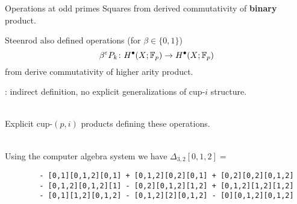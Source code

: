 
%
%
%

\begin{frame}[fragile]{Operations at odd primes}
	\pause
	Squares from derived commutativity of \textbf{binary} product.

	\medskip\pause
	Steenrod also defined operations (for $\beta \in \{0,1\}$)
	\[
	\beta^{\varepsilon} P_k \colon H^\bullet(X; {\mathbb{F}_p}) \to H^\bullet(X; {\mathbb{F}_p})
	\]
	from derive commutativity of higher arity product.

	\medskip\pause
	: indirect definition, no explicit generalizations of cup-$i$ structure.

	\medskip\pause
	 \\
	Explicit cup-$(p,i)$ products defining these operations.

	\medskip\pause
	 \\
	Using the computer algebra system  we have $\Delta_{3,2}[0,1,2] = $

	\begin{verbatim}
		- [0,1][0,1,2][0,1] + [0,1,2][0,2][0,1] + [0,2][0,2][0,1,2]
		- [0,1,2][0,1,2][1] - [0,2][0,1,2][1,2] + [0,1,2][1,2][1,2]
		- [0,1][1,2][0,1,2] - [0,1,2][2][0,1,2] - [0][0,1,2][0,1,2]
	\end{verbatim}
\end{frame}

